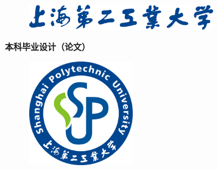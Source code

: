 \pagestyle{empty}
\linespread{0.8}
\vspace*{\fill}
\begin{figure}[htbp!]
    \centering
    \includegraphics[width=8cm]{../res/title.eps}
\end{figure}
\begin{center}
    \heiti\bfseries
    本科毕业设计（论文）
\end{center}

\begin{figure}[htbp!]
    \centering
    \includegraphics[height=4.5cm,width=4.5cm]{../res/logo.eps}
\end{figure}

